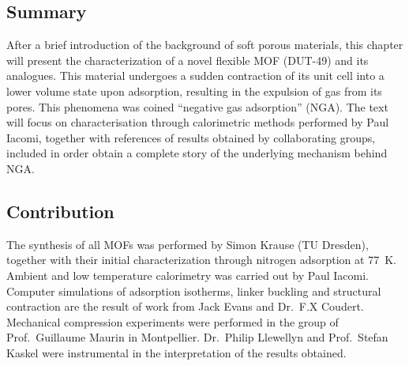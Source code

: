 \subsection*{Summary}

After a brief introduction of the background of soft porous 
materials, this chapter will present the characterization of a novel
flexible MOF (DUT-49) and its analogues. This material undergoes
a sudden contraction of its unit cell into a lower volume state
upon adsorption, resulting in the expulsion of gas from its pores.
This phenomena was coined ``negative gas adsorption'' (NGA).
The text will focus on characterisation through calorimetric methods
performed by Paul Iacomi, together with references
of results obtained by collaborating groups, included in order
obtain a complete story of the underlying mechanism behind NGA.

\subsection*{Contribution}

The synthesis of all MOFs was performed by Simon Krause
(TU Dresden), together with their initial characterization through 
nitrogen adsorption at \SI{77}{\kelvin}.
Ambient and low temperature calorimetry was carried out by 
Paul Iacomi. Computer simulations of adsorption isotherms, 
linker buckling and structural contraction
are the result of work from Jack Evans and Dr.\ F.X Coudert.
Mechanical compression experiments were performed in 
the group of Prof.\ Guillaume Maurin in Montpellier. 
Dr.\ Philip Llewellyn and Prof.\ Stefan Kaskel were 
instrumental in the interpretation of the results obtained.
